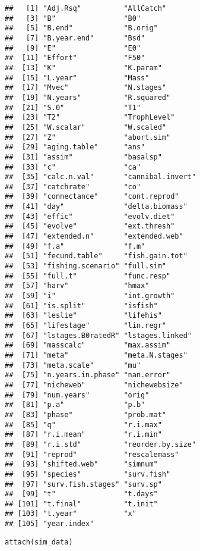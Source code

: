 \documentclass{article}\usepackage[]{graphicx}\usepackage[]{color}
\makeatletter
\newenvironment{kframe}{%
 \def\at@end@of@kframe{}%
 \ifinner\ifhmode%
  \def\at@end@of@kframe{\end{minipage}}%
  \begin{minipage}{\columnwidth}%
 \fi\fi%
 \def\FrameCommand##1{\hskip\@totalleftmargin \hskip-\fboxsep
 \colorbox{shadecolor}{##1}\hskip-\fboxsep
     \hskip-\linewidth \hskip-\@totalleftmargin \hskip\columnwidth}%
 \MakeFramed {\advance\hsize-\width
   \@totalleftmargin\z@ \linewidth\hsize
   \@setminipage}}%
 {\par\unskip\endMakeFramed%
 \at@end@of@kframe}
\newenvironment{knitrout}{}{} %
\makeatother
\begin{document}
\begin{knitrout}
\begin{kframe}
\begin{lstlisting}[style=printcode]
##   [1] "Adj.Rsq"          "AllCatch"        
##   [3] "B"                "B0"              
##   [5] "B.end"            "B.orig"          
##   [7] "B.year.end"       "Bsd"             
##   [9] "E"                "E0"              
##  [11] "Effort"           "F50"             
##  [13] "K"                "K.param"         
##  [15] "L.year"           "Mass"            
##  [17] "Mvec"             "N.stages"        
##  [19] "N.years"          "R.squared"       
##  [21] "S.0"              "T1"              
##  [23] "T2"               "TrophLevel"      
##  [25] "W.scalar"         "W.scaled"        
##  [27] "Z"                "abort.sim"       
##  [29] "aging.table"      "ans"             
##  [31] "assim"            "basalsp"         
##  [33] "c"                "ca"              
##  [35] "calc.n.val"       "cannibal.invert" 
##  [37] "catchrate"        "co"              
##  [39] "connectance"      "cont.reprod"     
##  [41] "day"              "delta.biomass"   
##  [43] "effic"            "evolv.diet"      
##  [45] "evolve"           "ext.thresh"      
##  [47] "extended.n"       "extended.web"    
##  [49] "f.a"              "f.m"             
##  [51] "fecund.table"     "fish.gain.tot"   
##  [53] "fishing.scenario" "full.sim"        
##  [55] "full.t"           "func.resp"       
##  [57] "harv"             "hmax"            
##  [59] "i"                "int.growth"      
##  [61] "is.split"         "isfish"          
##  [63] "leslie"           "lifehis"         
##  [65] "lifestage"        "lin.regr"        
##  [67] "lstages.B0ratedR" "lstages.linked"  
##  [69] "masscalc"         "max.assim"       
##  [71] "meta"             "meta.N.stages"   
##  [73] "meta.scale"       "mu"              
##  [75] "n.years.in.phase" "nan.error"       
##  [77] "nicheweb"         "nichewebsize"    
##  [79] "num.years"        "orig"            
##  [81] "p.a"              "p.b"             
##  [83] "phase"            "prob.mat"        
##  [85] "q"                "r.i.max"         
##  [87] "r.i.mean"         "r.i.min"         
##  [89] "r.i.std"          "reorder.by.size" 
##  [91] "reprod"           "rescalemass"     
##  [93] "shifted.web"      "simnum"          
##  [95] "species"          "surv.fish"       
##  [97] "surv.fish.stages" "surv.sp"         
##  [99] "t"                "t.days"          
## [101] "t.final"          "t.init"          
## [103] "t.year"           "x"               
## [105] "year.index"
\end{lstlisting}
\begin{lstlisting}[style=printcode]
attach(sim_data)\end{lstlisting}

\end{kframe}
\end{knitrout}
\end{document}
